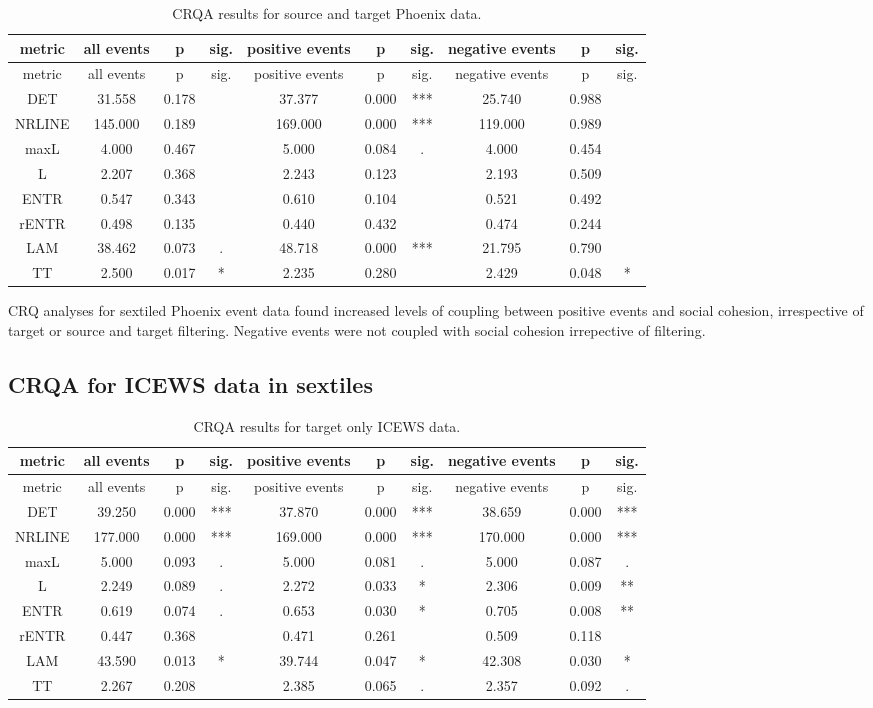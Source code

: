 \begin{appendix}
\begin{longtable}[]{@{}cccccccccc@{}}
\caption{CRQA results for source and target Phoenix
data.}\tabularnewline
\toprule
metric & all events & p & sig. & positive events & p & sig. & negative
events & p & sig.\tabularnewline
\midrule
\endfirsthead
\toprule
metric & all events & p & sig. & positive events & p & sig. & negative
events & p & sig.\tabularnewline
\midrule
\endhead
DET & 31.558 & 0.178 & & 37.377 & 0.000 & *** & 25.740 & 0.988
&\tabularnewline
NRLINE & 145.000 & 0.189 & & 169.000 & 0.000 & *** & 119.000 & 0.989
&\tabularnewline
maxL & 4.000 & 0.467 & & 5.000 & 0.084 & . & 4.000 & 0.454
&\tabularnewline
L & 2.207 & 0.368 & & 2.243 & 0.123 & & 2.193 & 0.509 &\tabularnewline
ENTR & 0.547 & 0.343 & & 0.610 & 0.104 & & 0.521 & 0.492
&\tabularnewline
rENTR & 0.498 & 0.135 & & 0.440 & 0.432 & & 0.474 & 0.244
&\tabularnewline
LAM & 38.462 & 0.073 & . & 48.718 & 0.000 & *** & 21.795 & 0.790
&\tabularnewline
TT & 2.500 & 0.017 & * & 2.235 & 0.280 & & 2.429 & 0.048 &
*\tabularnewline
\bottomrule
\end{longtable}

CRQ analyses for sextiled Phoenix event data found increased levels of
coupling between positive events and social cohesion, irrespective of
target or source and target filtering. Negative events were not coupled
with social cohesion irrepective of filtering.

\hypertarget{crqa-for-icews-data-in-sextiles}{%
\subsection{CRQA for ICEWS data in
sextiles}\label{crqa-for-icews-data-in-sextiles}}

\begin{longtable}[]{@{}cccccccccc@{}}
\caption{CRQA results for target only ICEWS data.}\tabularnewline
\toprule
metric & all events & p & sig. & positive events & p & sig. & negative
events & p & sig.\tabularnewline
\midrule
\endfirsthead
\toprule
metric & all events & p & sig. & positive events & p & sig. & negative
events & p & sig.\tabularnewline
\midrule
\endhead
DET & 39.250 & 0.000 & *** & 37.870 & 0.000 & *** & 38.659 & 0.000 &
***\tabularnewline
NRLINE & 177.000 & 0.000 & *** & 169.000 & 0.000 & *** & 170.000 & 0.000
& ***\tabularnewline
maxL & 5.000 & 0.093 & . & 5.000 & 0.081 & . & 5.000 & 0.087 &
.\tabularnewline
L & 2.249 & 0.089 & . & 2.272 & 0.033 & * & 2.306 & 0.009 &
**\tabularnewline
ENTR & 0.619 & 0.074 & . & 0.653 & 0.030 & * & 0.705 & 0.008 &
**\tabularnewline
rENTR & 0.447 & 0.368 & & 0.471 & 0.261 & & 0.509 & 0.118
&\tabularnewline
LAM & 43.590 & 0.013 & * & 39.744 & 0.047 & * & 42.308 & 0.030 &
*\tabularnewline
TT & 2.267 & 0.208 & & 2.385 & 0.065 & . & 2.357 & 0.092 &
.\tabularnewline
\bottomrule
\end{longtable}


\end{appendix}
